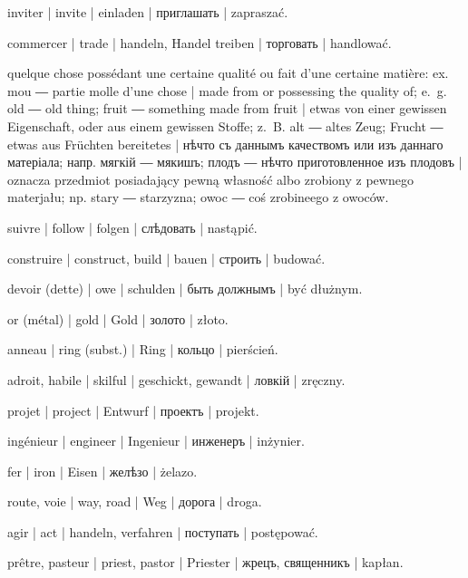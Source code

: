 \begin{ekzvocab}{1em}
 inviter | invite | einladen | приглашать | zapraszać.

 commercer | trade | handeln, Handel treiben | торговать | handlować.

 quelque chose possédant une certaine qualité ou fait d’une certaine matière: ex.  mou ―  partie molle d’une chose | made from or possessing the quality of; e.~g.  old ―  old thing;  fruit ―  something made from fruit | etwas von einer gewissen Eigenschaft, oder aus einem gewissen Stoffe; z.~B.  alt ―  altes Zeug;  Frucht ―  etwas aus Früchten bereitetes | нѣчто съ даннымъ качествомъ или изъ даннаго матеріала; напр.  мягкій ―  мякишъ;  плодъ ―  нѣчто приготовленное изъ плодовъ | oznacza przedmiot posiadający pewną własność albo zrobiony z pewnego materjału; np.  stary ―  starzyzna;  owoc ―  coś zrobineego z owoców.

 suivre | follow | folgen | слѣдовать | nastąpić.

 construire | construct, build | bauen | строить | budować.

 devoir (dette) | owe | schulden | быть должнымъ | być dłużnym.

 or (métal) | gold | Gold | золото | złoto.

 anneau | ring (subst.) | Ring | кольцо | pierścień.

 adroit, habile | skilful | geschickt, gewandt | ловкій | zręczny.

 projet | project | Entwurf | проектъ | projekt.

 ingénieur | engineer | Ingenieur | инженеръ | inżynier.

 fer | iron | Eisen | желѣзо | żelazo.

 route, voie | way, road | Weg | дорога | droga.

 agir | act | handeln, verfahren | поступать | postępować.

 prêtre, pasteur | priest, pastor | Priester | жрецъ, священникъ | kapłan.


\end{ekzvocab}
